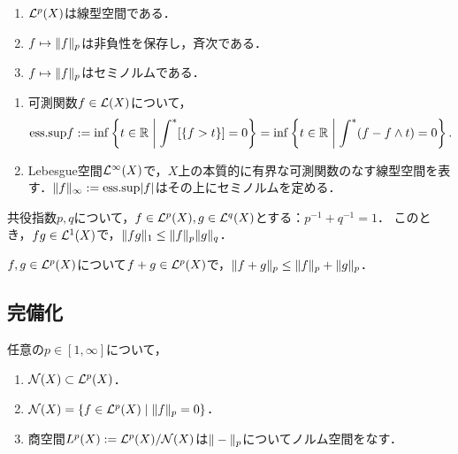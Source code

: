 \documentclass[uplatex,dvipdfmx]{jsreport}
\begin{document}
\begin{lemma}\mbox{}
    \begin{enumerate}
        \item $\mathcal{L}^p(X)$は線型空間である．
        \item $f\mapsto\|f\|_p$は非負性を保存し，斉次である．
        \item $f\mapsto\|f\|_p$はセミノルムである．
    \end{enumerate}
\end{lemma}

\begin{definition}\mbox{}
    \begin{enumerate}
        \item 可測関数$f\in\mathcal{L}(X)$について，
        \[\mathrm{ess.sup} f:=\inf\left\{t\in\mathbb{R}\;\middle|\;\int^*[\{f>t\}]=0\right\}=\inf\left\{t\in\mathbb{R}\;\middle|\;\int^*(f-f\land t)=0\right\}.\]
        \item Lebesgue空間$\mathcal{L}^\infty(X)$で，$X$上の本質的に有界な可測関数のなす線型空間を表す．$\|f\|_\infty:=\mathrm{ess.sup}\lvert f\rvert$はその上にセミノルムを定める．
    \end{enumerate}
\end{definition}

\begin{lemma}
    共役指数$p,q$について，$f\in\mathcal{L}^p(X),g\in\mathcal{L}^q(X)$とする：$p^{-1}+q^{-1}=1$．
    このとき，$fg\in\mathcal{L}^1(X)$で，$\|fg\|_1\le\|f\|_p\|g\|_q$．
\end{lemma}

\begin{lemma}
    $f,g\in\mathcal{L}^p(X)$について$f+g\in\mathcal{L}^p(X)$で，$\|f+g\|_p\le\|f\|_p+\|g\|_p$．
\end{lemma}

\subsection{完備化}

\begin{lemma}
    任意の$p\in[1,\infty]$について，
    \begin{enumerate}
        \item $\mathcal{N}(X)\subset\mathcal{L}^p(X)$．
        \item $\mathcal{N}(X)=\left\{f\in\mathcal{L}^p(X)\mid\|f\|_p=0\right\}$．
        \item 商空間$L^p(X):=\mathcal{L}^p(X)/\mathcal{N}(X)$は$\|-\|_p$についてノルム空間をなす．
    \end{enumerate}
\end{lemma}
\end{document}
